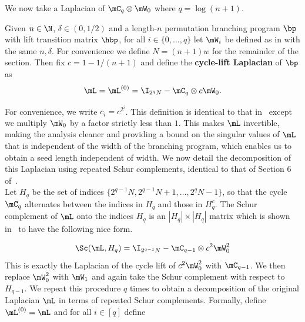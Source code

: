 We now take a Laplacian of $\mC_q\otimes \mW_0$ where $q=\log(n+1)$. 
\begin{definition}\label{def:cycleDecomp}
Given $n\in \N$, $\delta\in(0,1/2)$ and a length-$n$ permutation branching program $\bp$ with lift transition matrix $\hbp$, for all $i\in \{0,\dots,q\}$ let $\mW_i$ be defined as in  with the same $n,\delta$. For convenience we define $N=(n+1)w$ for the remainder of the section. Then fix $c=1-1/(n+1)$ and define the \textbf{cycle-lift Laplacian} of $\bp$ as
$$\mL=\mL^{(0)}=\I_{2^qN}-\mC_q\otimes c\mW_0.$$
\end{definition}
For convenience, we write $c_i=c^{2^i}$. This definition is identical to that in~\cite{AhmadinejadKeMuPeSiVa19} except we multiply $\mW_0$ by a factor strictly less than $1$. This makes $\mL$ invertible, making the analysis cleaner and providing a bound on the singular values of $\mL$ that is independent of the width of the branching program, which enables us to obtain a seed length independent of width. We now detail the decomposition of this Laplacian using repeated Schur complements, identical to that of Section 6 of~\cite{AhmadinejadKeMuPeSiVa19}.\\

Let $H_q$ be the set of indices $\{2^{q-1}N,2^{q-1}N+1,\dots ,2^q N-1\}$, so that the cycle $\mC_q$ alternates between the indices in $H_q$ and those in $H^c_q$. The Schur complement of $\mL$ onto the indices $H_q$ is an $|H_q|\times|H_q|$ matrix which is shown in~\cite{AhmadinejadKeMuPeSiVa19} to have the following nice form. %

\[\Sc(\mL,H_q)=\I_{2^{q-1}N}-\mC_{q-1}\otimes c^2\mW_0^2\]
This is exactly the Laplacian of the cycle lift of $c^2\mW_0^2$ with $\mC_{q-1}$. We then replace $\mW_0^2$ with $\mW_1$ and again take the Schur complement with respect to $H_{q-1}$. We repeat this procedure $q$ times to obtain a decomposition of the original Laplacian $\mL$ in terms of repeated Schur complements. Formally, define $\mL^{(0)}=\mL$ and for all $i\in [q]$ define


